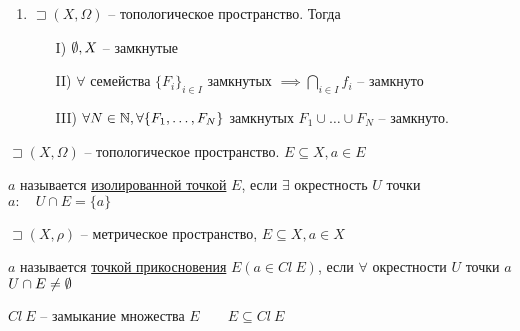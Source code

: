 \begin{corollary}
    \begin{enumerate}
        \item $\sqsupset (X, \Omega)$ -- топологическое пространство. Тогда
            \begin{enumerate}
                \item [I)] $\emptyset , X$ -- замкнутые
                \item [II)] $\forall $ семейства $\{F_i\}_{i\in I}$ замкнутых  $\implies  \bigcap\limits_{i \in  I} f_i$ -- замкнуто
                \item [III)] $\forall N\in \mathbb{N} , \forall \{F_1, \ldots, F_N\}$ замкнутых $F_1\cup \ldots\cup  F_N$ -- замкнуто.
            \end{enumerate}
    \end{enumerate}
\end{corollary}

\begin{definition}
    $ \sqsupset (X, \Omega)$ -- топологическое пространство. $E\subseteq X, a\in E$

    $a$ называется \underline{изолированной точкой} $E$, если  $\exists $ окрестность $U$ точки  $a: \quad U\cap E = \{a\}$
\end{definition}

\begin{definition}
    $ \sqsupset (X, \rho)$ -- метрическое пространство, $E\subseteq X, a\in X$

    $a$ называется \underline{точкой прикосновения}  $E \left( a\in Cl ~E \right) $, если $\forall $ окрестности $U$ точки $a$  $U\cap E \neq \emptyset $

    $Cl~E$ -- замыкание множества $E\qquad E\subseteq Cl~E$
\end{definition}


